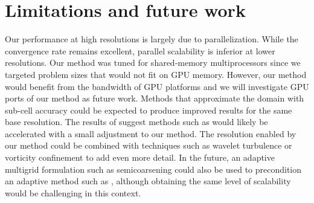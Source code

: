 \section{Limitations and future work}
\label{sec_discussion}
Our performance at high resolutions is largely due to parallelization. While the convergence rate remains excellent, parallel scalability is inferior at lower resolutions. Our method was tuned
for shared-memory multiprocessors since we targeted problem sizes that would not fit on GPU memory. However, our method would benefit from the bandwidth of GPU platforms and we will
investigate GPU ports of our method as future work. Methods that approximate the domain with sub-cell accuracy could be expected to produce improved results for the same base resolution. The results of \cite{SW05} suggest methods such as
 \cite{BBB07} would likely be accelerated with a small adjustment to our method. The resolution enabled by our method could be combined with techniques such as wavelet turbulence
 \cite{KTJG08} or vorticity confinement \cite{FSJ01} to add even more detail. In the future, an adaptive multigrid formulation such as semicoarsening \cite{trottenberg:2001:multigrid}
 could also be used to precondition an adaptive method such as \cite{LGF04}, although obtaining the same level of scalability would be challenging in this context.

